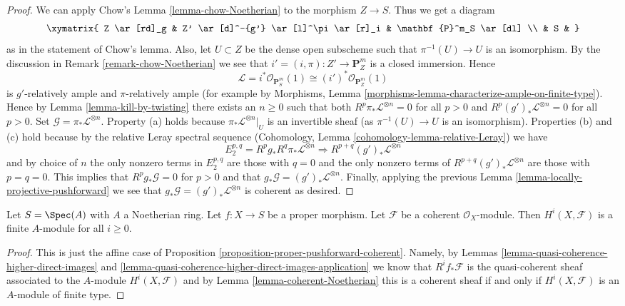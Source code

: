 \begin{proof}
\medskip\noindent
We can apply Chow's Lemma \ref{lemma-chow-Noetherian}
to the morphism $Z \to S$. Thus we get a diagram
$$
\xymatrix{
Z \ar[rd]_g & Z' \ar[d]^-{g'} \ar[l]^\pi \ar[r]_i & \mathbf{P}^m_S \ar[dl] \\
& S &
}
$$
as in the statement of Chow's lemma. Also, let $U \subset Z$ be
the dense open subscheme such that $\pi^{-1}(U) \to U$ is an isomorphism.
By the discussion in Remark \ref{remark-chow-Noetherian} we see that
$i' = (i, \pi) : Z' \to \mathbf{P}^m_Z$ is
a closed immersion. Hence
$$
\mathcal{L} = i^*\mathcal{O}_{\mathbf{P}^m_S}(1) \cong
(i')^*\mathcal{O}_{\mathbf{P}^m_Z}(1)
$$
is $g'$-relatively ample and $\pi$-relatively ample (for example by
Morphisms, Lemma \ref{morphisms-lemma-characterize-ample-on-finite-type}).
Hence by Lemma \ref{lemma-kill-by-twisting}
there exists an $n \geq 0$ such that
both $R^p\pi_*\mathcal{L}^{\otimes n} = 0$ for all $p > 0$ and
$R^p(g')_*\mathcal{L}^{\otimes n} = 0$ for all $p > 0$.
Set $\mathcal{G} = \pi_*\mathcal{L}^{\otimes n}$.
Property (a) holds because $\pi_*\mathcal{L}^{\otimes n}|_U$ is
an invertible sheaf (as $\pi^{-1}(U) \to U$ is an isomorphism).
Properties (b) and (c) hold because by the relative Leray
spectral sequence
(Cohomology, Lemma \ref{cohomology-lemma-relative-Leray})
we have
$$
E_2^{p, q} = R^pg_* R^q\pi_*\mathcal{L}^{\otimes n}
\Rightarrow
R^{p + q}(g')_*\mathcal{L}^{\otimes n}
$$
and by choice of $n$ the only nonzero terms in $E_2^{p, q}$ are
those with $q = 0$ and the only nonzero terms of
$R^{p + q}(g')_*\mathcal{L}^{\otimes n}$ are those with $p = q = 0$.
This implies that $R^pg_*\mathcal{G} = 0$ for $p > 0$ and
that $g_*\mathcal{G} = (g')_*\mathcal{L}^{\otimes n}$.
Finally, applying the previous
Lemma \ref{lemma-locally-projective-pushforward}
we see that $g_*\mathcal{G} = (g')_*\mathcal{L}^{\otimes n}$ is
coherent as desired.
\end{proof}

\begin{lemma}
\label{lemma-proper-over-affine-cohomology-finite}
Let $S = \Spec(A)$ with $A$ a Noetherian ring.
Let $f : X \to S$ be a proper morphism.
Let $\mathcal{F}$ be a coherent $\mathcal{O}_X$-module.
Then $H^i(X, \mathcal{F})$ is a finite $A$-module for all $i \geq 0$.
\end{lemma}

\begin{proof}
This is just the affine case of
Proposition \ref{proposition-proper-pushforward-coherent}.
Namely, by Lemmas \ref{lemma-quasi-coherence-higher-direct-images} and
\ref{lemma-quasi-coherence-higher-direct-images-application} we know that
$R^if_*\mathcal{F}$ is the quasi-coherent sheaf associated
to the $A$-module $H^i(X, \mathcal{F})$
and by Lemma \ref{lemma-coherent-Noetherian} this is
a coherent sheaf if and only if $H^i(X, \mathcal{F})$
is an $A$-module of finite type.
\end{proof}

